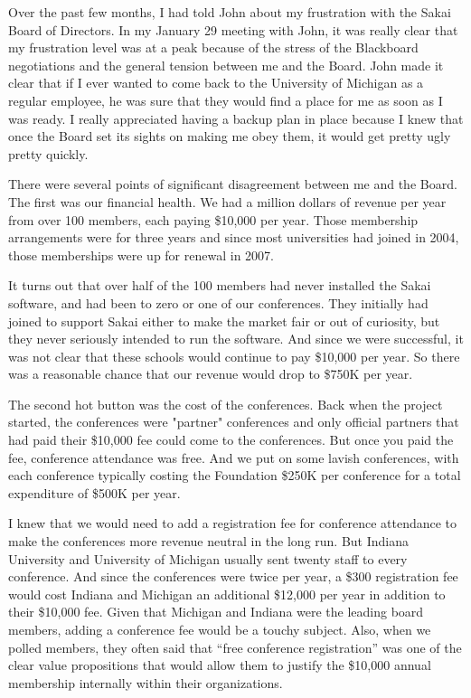 \documentclass[12pt]{book}
\begin{document}

Over the past few months, I had told John about my frustration with the Sakai
Board of Directors.  In my January 29 meeting with John, it was really
clear that my frustration level was at a peak because of the stress of the Blackboard
negotiations and the general tension between me and the Board.  John made it
clear that if I ever wanted to come back to the University of Michigan as a
regular employee, he was sure that they would find a place for me as soon as I
was ready.   I really appreciated having a backup plan in place because
I knew that once the Board set its sights on making me obey them, it would get pretty
ugly pretty quickly.

There were several points of significant disagreement between me and the Board.
The first was our financial health.   We had a million dollars of revenue per year
from over 100 members, each paying \$10,000 per year.   Those membership
arrangements were for three years and since most universities had joined in 2004,
those memberships were up for renewal in 2007.

It turns out that over half of the 100 members had never installed the Sakai software,
and had been to zero or one of our conferences.   They initially had joined to support
Sakai either to make the market fair or out of curiosity, but they never
seriously intended to run the software.
And since we were successful, it was not clear that these schools would continue to
pay \$10,000 per year.   So there was a reasonable chance that our revenue would drop
to \$750K per year.

The second hot button was the cost of the conferences.   Back when the project started,
the conferences were "partner" conferences and only official partners that had paid their
\$10,000 fee could come to the conferences.   But once you paid the fee, conference
attendance was free.  And we put on some lavish conferences, with each conference
typically costing the Foundation \$250K per conference for a total expenditure of
\$500K per year.

I knew that we would need to add a registration fee for conference attendance to make
the conferences more revenue neutral in the long run.  But Indiana University and
University of Michigan usually sent twenty staff to every conference.   And since the
conferences were twice per year, a \$300 registration fee would cost Indiana and Michigan
an additional \$12,000 per year in addition to their \$10,000 fee.   Given that
Michigan and Indiana were the leading board members, adding a conference fee
would be a touchy subject.   Also, when we polled members, they often said that
``free conference registration'' was one of the clear value propositions that would
allow them to justify the \$10,000 annual membership internally within their
organizations.
\end{document}

